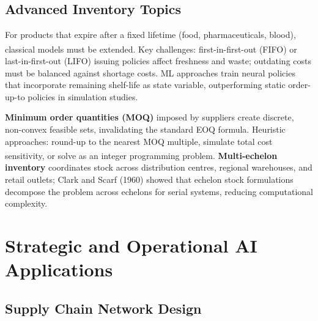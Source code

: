 \subsection{Advanced Inventory Topics}

\begin{tcbitemize}[ skin=sectionraster ]

    \tcbitem[title=Perishable Inventory, raster multicolumn=3]
    For products that expire after a fixed lifetime (food, pharmaceuticals, blood), classical models must be extended\textsuperscript{\cite{nahmiasOptimalOrderingPolicies1973}}.
    Key challenges: first-in-first-out (FIFO) or last-in-first-out (LIFO) issuing policies affect freshness and waste; outdating costs must be balanced against shortage costs.
    ML approaches train neural policies that incorporate remaining shelf-life as state variable, outperforming static order-up-to policies in simulation studies.

    \tcbitem[title=Minimum Order Quantities and Multi-Echelon, raster multicolumn=3]
    \textbf{Minimum order quantities (MOQ)} imposed by suppliers create discrete, non-convex feasible sets, invalidating the standard EOQ formula.
    Heuristic approaches: round-up to the nearest MOQ multiple, simulate total cost sensitivity, or solve as an integer programming problem\textsuperscript{\cite[][pp.~210--215]{vandeputInventoryOptimization2020}}.
    \textbf{Multi-echelon inventory} coordinates stock across distribution centres, regional warehouses, and retail outlets; Clark and Scarf (1960) showed that echelon stock formulations decompose the problem across echelons for serial systems, reducing computational complexity.

\end{tcbitemize}

\section{Strategic and Operational AI Applications}

\subsection{Supply Chain Network Design}

